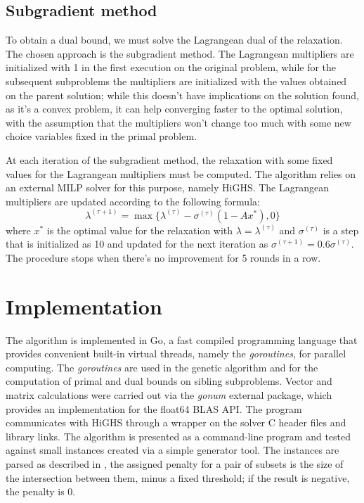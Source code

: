 \documentclass[a4paper]{article}
\begin{document}
\subsection{Subgradient method}
To obtain a dual bound, we must solve the Lagrangean dual of the relaxation. The chosen approach is the subgradient method. The Lagrangean multipliers are initialized with 1 in the first execution on the original problem, while for the subsequent subproblems the multipliers are initialized with the values obtained on the parent solution; while this doesn't have implications on the solution found, as it's a convex problem, it can help converging faster to the optimal solution, with the assumption that the multipliers won't change too much with some new choice variables fixed in the primal problem.

At each iteration of the subgradient method, the relaxation with some fixed values for the Lagrangean multipliers must be computed. The algorithm relies on an external MILP solver for this purpose, namely HiGHS.
The Lagrangean multipliers are updated according to the following formula:
$$
\lambda^{(\tau+1)}=\max\{\lambda^{(\tau)} - \sigma^{(\tau)}(1 - Ax^*), 0\}
$$
where $x^*$ is the optimal value for the relaxation with $\lambda=\lambda^{(\tau)}$ and $\sigma^{(\tau)}$ is a step that is initialized as 10 and updated for the next iteration as $\sigma^{(\tau+1)}=0.6\sigma^{(\tau)}$.
The procedure stops when there's no improvement for 5 rounds in a row.

\section{Implementation}

The algorithm is implemented in Go, a fast compiled programming language that provides convenient built-in virtual threads, namely the \textit{goroutines}, for parallel computing. The \textit{goroutines} are used in the genetic algorithm and for the computation of primal and dual bounds on sibling subproblems.
Vector and matrix calculations were carried out via the \textit{gonum} external package, which provides an implementation for the float64 BLAS API.
The program communicates with HiGHS through a wrapper on the solver C header files and library links.
The algorithm is presented as a command-line program and tested against small instances created via a simple generator tool.
The instances are parsed as described in \cite{CARRABS2024106620}, the assigned penalty for a pair of subsets is the size of the intersection between them, minus a fixed threshold; if the result is negative, the penalty is 0.
\end{document}
